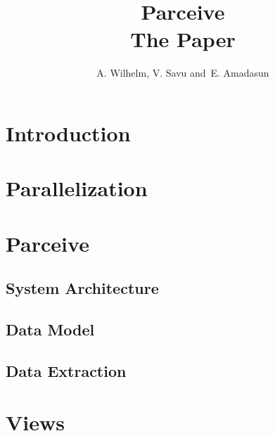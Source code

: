 \documentclass[conference]{IEEEtran}
\begin{document}
\title{Parceive\\The Paper}

\author{A. Wilhelm,
		V. Savu
        and~E. Amadasun}%


\maketitle


\IEEEdisplaynontitleabstractindextext
\IEEEpeerreviewmaketitle

\section{Introduction}
\label{sec:introduction}

\section{Parallelization}
\label{sec:parallelization}

\section{Parceive}
\label{sec:parceive}

\subsection{System Architecture}
\label{sec:system_architecture}

\subsection{Data Model}
\label{sec:data_model}

\subsection{Data Extraction}
\label{sec:data_extraction}

\section{Views}
\label{sec:views}
\end{document}
